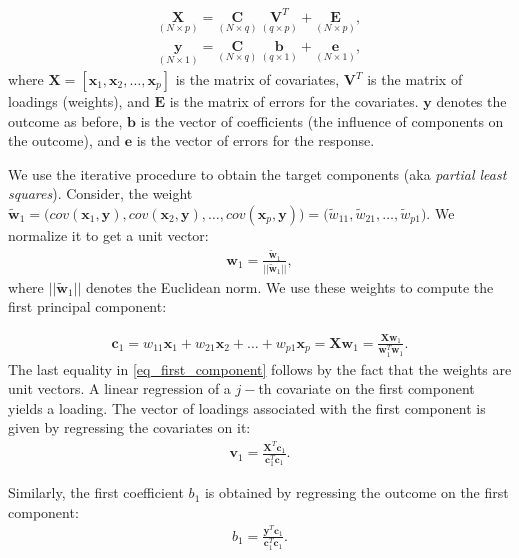 \documentclass[12pt]{article}
\begin{document}
\begin{align}
   \underset{(N \times p)}{\mathbf{X}} = 
  \underset{(N \times q)}{\mathbf{C}} \  \underset{(q \times p)}{\mathbf{V}^T} + \underset{(N \times p)}{\mathbf{E}}, \\
  \underset{(N \times 1)}{\mathbf{y}} = 
  \underset{(N \times q)}{\mathbf{C}} \  \underset{(q \times 1)}{\mathbf{b}} + \underset{(N \times 1)}{\mathbf{e}},
\end{align}
where $\mathbf{X} = [\mathbf{x}_1, \mathbf{x}_2, \dots, \mathbf{x}_p]$ is the matrix of covariates, $\mathbf{V}^T$ is the matrix of loadings (weights),  and $\mathbf{E}$ is the matrix of errors for the covariates. $\mathbf{y}$ denotes the outcome as before, $\mathbf{b}$ is the vector of coefficients (the influence of components on the outcome), and $\mathbf{e}$ is the vector of errors for the response. 

We use the iterative procedure to obtain the target components (aka \textit{partial least squares}). Consider, the weight $\tilde{\mathbf{w}}_1 = \big( cov(\mathbf{x}_1, \mathbf{y}), cov(\mathbf{x}_2, \mathbf{y}), \dots, cov(\mathbf{x}_p, \mathbf{y}) \big) = \big(\tilde{w}_{11}, \tilde{w}_{21}, \dots, \tilde{w}_{p1} \big)$. We normalize it to get a unit vector: 
\begin{align*}
    \mathbf{w}_1 = \frac{\tilde{\mathbf{w}}_1}{||\tilde{\mathbf{w}}_1||},
\end{align*}
where $||\tilde{\mathbf{w}}_1||$ denotes the Euclidean norm.  We use these weights to compute the first principal component:

\begin{align}\label{eq_first_component}
    \mathbf{c}_1 = w_{11}\mathbf{x}_1 + w_{21}\mathbf{x}_2 +  \dots + w_{p1}\mathbf{x}_p = \mathbf{X}\mathbf{w}_1 = \frac{\mathbf{X}\mathbf{w}_1}{\mathbf{w}_1^T\mathbf{w}_1}.
\end{align}
The last equality in \eqref{eq_first_component} follows by the fact that the weights are unit vectors. A linear regression of a $j-$th covariate on the first component yields a loading. The vector of loadings associated with the first component is given by regressing the covariates on it:
\begin{align}
    \mathbf{v}_1 = \frac{\mathbf{X}^T\mathbf{c}_1}{\mathbf{c}_1^T \mathbf{c}_1}.
\end{align}

Similarly, the first coefficient $b_1$ is obtained by regressing the outcome on the first component:
\begin{align}
     b_1 = \frac{\mathbf{y}^T\mathbf{c}_1}{\mathbf{c}_1^T \mathbf{c}_1}.
\end{align}
\end{document}
